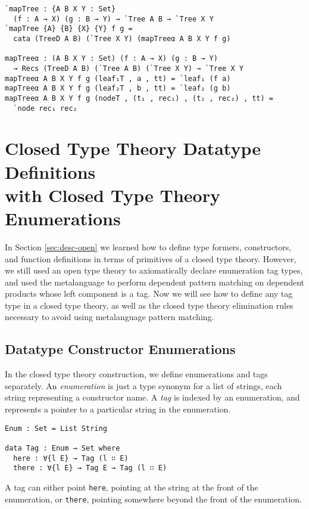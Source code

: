 \documentclass[runningheads,a4paper]{llncs}
\newcommand{\refsec}[1]{Section \ref{sec:#1}}
\begin{document}
\begin{verbatim}
`mapTree : {A B X Y : Set}
  (f : A → X) (g : B → Y) → `Tree A B → `Tree X Y
`mapTree {A} {B} {X} {Y} f g =
  cata (TreeD A B) (`Tree X Y) (mapTreeα A B X Y f g)

mapTreeα : (A B X Y : Set) (f : A → X) (g : B → Y)
  → Recs (TreeD A B) (`Tree A B) (`Tree X Y) → `Tree X Y
mapTreeα A B X Y f g (leaf₁T , a , tt) = `leaf₁ (f a)
mapTreeα A B X Y f g (leaf₂T , b , tt) = `leaf₂ (g b)
mapTreeα A B X Y f g (nodeT , (t₁ , rec₁) , (t₂ , rec₂) , tt) =
  `node rec₁ rec₂
\end{verbatim}

\section{Closed Type Theory Datatype Definitions
  \\with Closed Type Theory Enumerations}
\label{sec:desc-closed}

In \refsec{desc-open} we learned how to define type formers,
constructors, and function definitions in terms of primitives of a
closed type theory. However, we still used an open type theory to
axiomatically declare enumeration tag types, and used the metalanguage to perform
dependent pattern matching on dependent products whose left component is
a tag. Now we will see how to define any tag type in a closed type
theory, as well as the closed type theory elimination rules necessary
to avoid using metalanguage pattern matching.

\subsection{Datatype Constructor Enumerations}

In the closed type theory construction, we define enumerations and
tags separately. An {\it enumeration} is just a type synonym for a list of
strings, each string representing a constructor name. A {\it tag} is
indexed by an enumeration, and represents a pointer to a particular
string in the enumeration.

\begin{verbatim}
Enum : Set = List String

data Tag : Enum → Set where
  here : ∀{l E} → Tag (l ∷ E)
  there : ∀{l E} → Tag E → Tag (l ∷ E)
\end{verbatim}

A tag can either point {\tt here}, pointing at the string at the front
of the enumeration, or {\tt there}, pointing somewhere beyond the front
of the enumeration.
\end{document}
